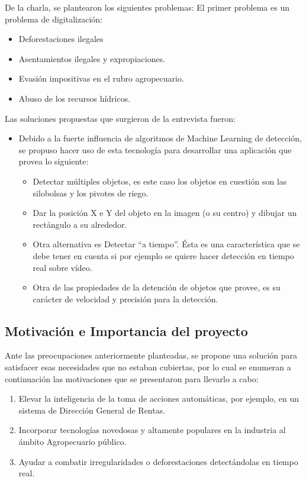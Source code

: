 De la charla, se plantearon los siguientes problemas:
El primer problema es un problema de digitalización:
\begin{itemize}
    \begin{itemize}
        \item Deforestaciones ilegales
        \item Asentamientos ilegales y expropiaciones.
        \item Evasión impositivas en el rubro agropecuario.
        \item Abuso de los recursos hídricos.
    \end{itemize}
\end{itemize}

Las soluciones propuestas que surgieron de la entrevista fueron:
\begin{itemize}
    \item Debido a la fuerte influencia de algoritmos de Machine Learning de detección, se propuso hacer uso de esta tecnología para desarrollar una aplicación que provea lo siguiente:
    \begin{itemize}
        \item Detectar múltiples objetos, es este caso los objetos en cuestión son las silobolsas y los pivotes de riego.
        \item Dar la posición X e Y del objeto en la imagen (o su centro) y dibujar un rectángulo a su alrededor.
        \item Otra alternativa es Detectar “a tiempo”. Ésta es una característica que se debe tener en cuenta si por ejemplo se quiere hacer detección en tiempo real sobre vídeo.
        \item Otra de las propiedades de la detención de objetos que provee, es su carácter de velocidad y precisión para la detección. 
    \end{itemize}
\end{itemize}

\subsection{Motivación e Importancia del proyecto}

Ante las preocupaciones anteriormente planteadas, se propone una solución para satisfacer esas necesidades que no estaban cubiertas, por lo cual se enumeran a continuación las motivaciones que se presentaron para llevarlo a cabo:

\begin{enumerate}
    \item Elevar la inteligencia de la toma de acciones automáticas, por ejemplo, en un sistema de Dirección General de Rentas.
    \item Incorporar tecnologías novedosas y altamente populares en la industria al ámbito Agropecuario público.
    \item Ayudar a combatir irregularidades o deforestaciones detectándolas en tiempo real.
\end{enumerate}

